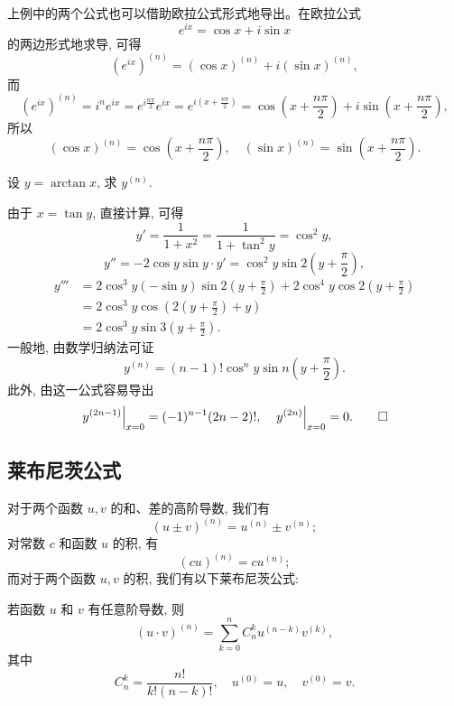 \begin{remark}\label{remark:ma-4-source-83}
上例中的两个公式也可以借助欧拉公式形式地导出。在欧拉公式
\[
  e^{ix}=\cos x+i\sin x
\]
的两边形式地求导, 可得
\[
  (e^{ix})^{(n)}
  =
  (\cos x)^{(n)}+i(\sin x)^{(n)},
\]
而
\[
  (e^{ix})^{(n)}
  =
  i^ne^{ix}
  =
  e^{i\frac{n\pi}{2}}e^{ix}
  =
  e^{i\left(x+\frac{n\pi}{2}\right)}
  =
  \cos\left(x+\frac{n\pi}{2}\right)
  +
  i\sin\left(x+\frac{n\pi}{2}\right),
\]
所以
\[
  (\cos x)^{(n)}
  =
  \cos\left(x+\frac{n\pi}{2}\right),\quad
  (\sin x)^{(n)}
  =
  \sin\left(x+\frac{n\pi}{2}\right).
\]
\end{remark}


\begin{example}\label{example:ma-4-4-5}
设 $y=\arctan x$, 求 $y^{(n)}$.
\end{example}


\begin{solve}
由于 $x=\tan y$, 直接计算, 可得
\[
  y'=\frac{1}{1+x^2}
  =
  \frac{1}{1+\tan^2y}
  =
  \cos^2y,
\]
\[
  y''
  =
  -2\cos y\sin y\cdot y'
  =
  \cos^2y\sin2\left(y+\frac{\pi}{2}\right),
\]
\[
\begin{aligned}
  y'''
  &=
  2\cos^3y(-\sin y)\sin2\left(y+\frac{\pi}{2}\right)
  +
  2\cos^4y\cos2\left(y+\frac{\pi}{2}\right)  \\
  &=
  2\cos^3y\cos\left(2\left(y+\frac{\pi}{2}\right)+y\right)  \\
  &=
  2\cos^3y\sin3\left(y+\frac{\pi}{2}\right).
\end{aligned}
\]
一般地, 由数学归纳法可证
\[
  y^{(n)}
  =
  (n-1)!\cos^ny\sin n\left(y+\frac{\pi}{2}\right).
\]
此外, 由这一公式容易导出
\[
  \left.y^{(2n-1)}\right|_{x=0}
  =
  (-1)^{n-1}(2n-2)!,
  \quad
  \left.y^{(2n)}\right|_{x=0}=0.
\qedhere
\]
\end{solve}


\subsection{莱布尼茨公式}
\label{subsec:ma-4-4-2}

对于两个函数 $u,v$ 的和、差的高阶导数, 我们有
\[
  (u\pm v)^{(n)}=u^{(n)}\pm v^{(n)};
\]
对常数 $c$ 和函数 $u$ 的积, 有
\[
  (cu)^{(n)}=cu^{(n)};
\]
而对于两个函数 $u,v$ 的积, 我们有以下莱布尼茨公式:

\begin{theorem}[{莱布尼茨公式}]\label{theorem:ma-4-4-1}
若函数 $u$ 和 $v$ 有任意阶导数, 则
\[
  (u\cdot v)^{(n)}
  =
  \sum_{k=0}^{n}C_n^ku^{(n-k)}v^{(k)},
\]
其中
\[
  C_n^k=\frac{n!}{k!(n-k)!},\quad u^{(0)}=u,\quad v^{(0)}=v.
\]
\end{theorem}


